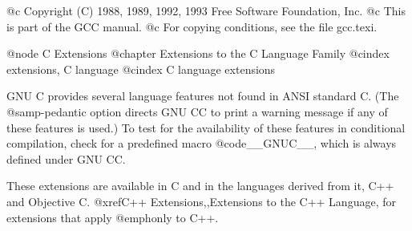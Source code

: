 @c Copyright (C) 1988, 1989, 1992, 1993 Free Software Foundation, Inc.
@c This is part of the GCC manual.
@c For copying conditions, see the file gcc.texi.

@node C Extensions
@chapter Extensions to the C Language Family
@cindex extensions, C language
@cindex C language extensions

GNU C provides several language features not found in ANSI standard C.
(The @samp{-pedantic} option directs GNU CC to print a warning message if
any of these features is used.)  To test for the availability of these
features in conditional compilation, check for a predefined macro
@code{__GNUC__}, which is always defined under GNU CC.

These extensions are available in C and in the languages derived from
it, C++ and Objective C.  @xref{C++ Extensions,,Extensions to the
C++ Language}, for extensions that apply @emph{only} to C++.

